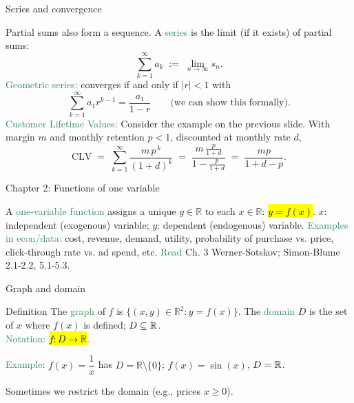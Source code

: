 \documentclass[10pt]{beamer}
\begin{document}
\begin{frame}{Series and convergence}

Partial sums also form a sequence. A \textcolor{SeaGreen}{series} is the limit (if it exists) of partial sums: 
\[
\sum_{k=1}^{\infty} a_k\; :=\; \lim_{n\to\infty} s_n.
\]
\textcolor{SeaGreen}{Geometric series:} converges if and only if $|r|<1$ with
\[
\sum_{k=1}^{\infty} a_1 r^{k-1}=\frac{a_1}{1-r} \qquad  \mbox{(we can show this formally).}
\]
\textcolor{SeaGreen}{Customer Lifetime Values:} Consider the example on the previous slide. With margin $m$ and monthly retention $p<1$, discounted at monthly rate $d$,
\[
\text{CLV}\;=\;\sum_{k=1}^\infty \frac{m\,p^{\,k}}{(1+d)^k}\;=\;\frac{m\,\frac{p}{1+d}}{1-\frac{p}{1+d}}\;=\;\frac{mp}{1+d-p}.
\]
\end{frame}




\begin{frame}{Chapter 2: Functions of one variable}

A \textcolor{SeaGreen}{one-variable function} assigns a unique $y\in\mathbb{R}$ to each $x\in\mathbb{R}$: \;\;\hl{$y=f(x)$}. 
\vskip 10pt
\qquad $x$: independent (exogenous) variable; $y$: dependent (endogenous) variable.
\vskip 8pt
\textcolor{SeaGreen}{Examples in econ/data:} cost, revenue, demand, utility, probability of purchase vs. price, click-through rate vs. ad spend, etc.
\vskip 8pt
\textcolor{SeaGreen}{Read} Ch. 3 Werner-Sotskov; Simon-Blume 2.1-2.2, 5.1-5.3.
\end{frame}

\begin{frame}{Graph and domain}

\begin{block}{Definition}
The \textcolor{SeaGreen}{graph} of $f$ is $\{(x,y)\in\mathbb{R}^2: y=f(x)\}$.
\vskip 6pt
The \textcolor{SeaGreen}{domain} $D$ is the set of $x$ where $f(x)$ is defined; $D\subseteq \mathbb R$. \\[4pt]
\textcolor{SeaGreen}{Notation:} \hl{$f:D \rightarrow \mathbb{R}$}.	
\end{block}
\bigskip

\textcolor{SeaGreen}{Example}: $f(x)=\dfrac{1}{x}$ has $D=\mathbb{R}\setminus\{0\}$; $f(x)=\sin(x)$, $D=\mathbb R$. 
\smallskip

Sometimes we restrict the domain (e.g., prices $x\ge 0$).
\end{frame}
\end{document}

